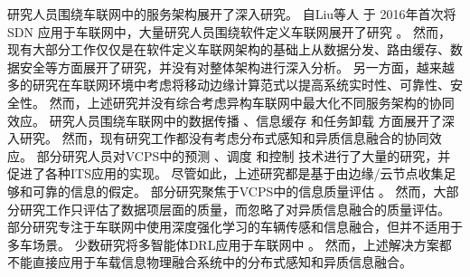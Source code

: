 研究人员围绕车联网中的服务架构展开了深入研究。
自Liu等人 \cite{liu2016cooperative} 于 2016年首次将 SDN 应用于车联网中，大量研究人员围绕软件定义车联网展开了研究 \cite{dai2018cooperative, luo2018sdnmac, liu2018coding, zhang2022ac-sdvn, zhao2022elite, lin2023alps, ahmed2023deep}。
然而，现有大部分工作仅仅是在软件定义车联网架构的基础上从数据分发、路由缓存、数据安全等方面展开了研究，并没有对整体架构进行深入分析。
另一方面，越来越多的研究在车联网环境中考虑将移动边缘计算范式以提高系统实时性、可靠性、安全性\cite{liu2017a, lang2022cooperative, liu2021fog, dai2021edge, zhang2022digital, liu2020adaptive, liao2021learning, liu2023mobility, liu2023asynchronous}。
然而，上述研究并没有综合考虑异构车联网中最大化不同服务架构的协同效应。
研究人员围绕车联网中的数据传播 \cite{liu2021fog, singh2020intent}、信息缓存 \cite{zhang2022digital, dai2020deep, su2018an} 和任务卸载 \cite{shang2021deep, liao2021learning} 方面展开了深入研究。
然而，现有研究工作都没有考虑分布式感知和异质信息融合的协同效应。
部分研究人员对VCPS中的预测 \cite{zhang2019a, zhang2020data}、调度 \cite{li2020cyber, lian2021cyber} 和控制 \cite{dai2016a, hu2017cyber, lv2018driving} 技术进行了大量的研究，并促进了各种ITS应用的实现。
尽管如此，上述研究都是基于由边缘/云节点收集足够和可靠的信息的假定。
部分研究聚焦于VCPS中的信息质量评估 \cite{liu2014temporal, dai2019temporal, liu2014scheduling, rager2017scalability, yoon2021performance}。
然而，大部分研究工作只评估了数据项层面的质量，而忽略了对异质信息融合的质量评估。
部分研究专注于车联网中使用深度强化学习的车辆传感和信息融合，但并不适用于多车场景。
少数研究将多智能体DRL应用于车联网中 \cite{kumar2022multi, he2021efficient}。
然而，上述解决方案都不能直接应用于车载信息物理融合系统中的分布式感知和异质信息融合。

